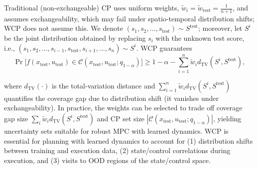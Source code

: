 \documentclass{l4dc2026}
\newcommand{\tvd}{d_\textrm{TV}}
\begin{document}
\noindent{} Traditional (non-exchangeable) CP uses uniform weights, $\tilde w_i = \tilde w_\text{test} = \frac{1}{n+1}$,  and assumes exchangeability, which may fail under spatio-temporal distribution shifts; WCP does not assume this. 
We denote $(s_1, s_2, \ldots, s_\textrm{test}) \sim S^\textrm{test}$; moreover, let $S^i$ be the joint distribution obtained by replacing $s_i$ with the unknown test score, i.e., $(s_1, s_2, \ldots, s_{i-1}, s_\textrm{test}, s_{i+1}, \ldots, s_n) \sim S^i$. WCP guarantees
\vspace{-5pt}
\begin{equation}\label{eq:cp_guarantee}
\Pr\big[f(x_{\textrm{test}},u_{\textrm{test}})\in \mathcal{C}(x_{\textrm{test}},u_{\textrm{test}};q_{1-\alpha})\big]
\ge 1-\alpha-\textstyle\sum_{i=1}^n \tilde w_i\tvd(S^{i},S^\textrm{test}),
\end{equation}
\vspace{-17pt}

\noindent where $d_\textrm{TV}(\cdot)$ is the total-variation distance and $\textstyle\sum_{i=1}^n \tilde w_i\tvd(S^{i},S^\textrm{test})$ quantifies the coverage gap due to distribution shift (it vanishes under exchangeability). In practice, the weights can be selected to trade off coverage gap size $\sum_i \tilde w_i\tvd(S^{i},S^\textrm{test})$ and CP set size $|\mathcal{C}(x_{\textrm{test}},u_{\textrm{test}};q_{1-\alpha})|$, yielding uncertainty sets suitable for robust MPC with learned dynamics. %
WCP is essential for planning with learned dynamics to account for (1) distribution shifts between training and execution data, (2) state/control correlations during execution, and (3) visits to OOD regions of the state/control space.
\end{document}
